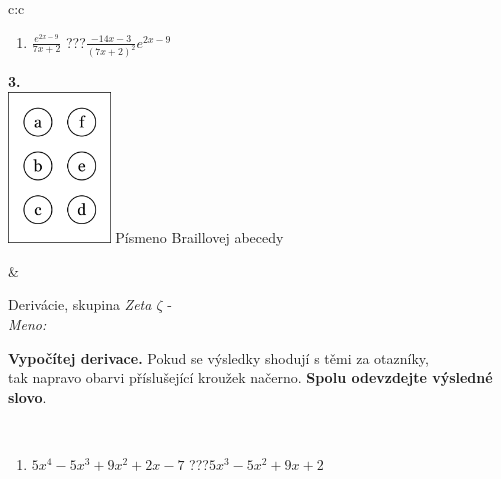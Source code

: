 \documentclass[10pt]{report}
\begin{document}
\begin{tabular}{c:c}
\begin{minipage}[c][104.5mm][t]{0.5\linewidth}
\begin{center}
\begin{minipage}{0.79\linewidth}
\begin{center}
\begin{varwidth}{\linewidth}
\begin{enumerate}
\item $\frac{e^{2x-9}}{7x+2}$\quad \dotfill\; ???\;\dotfill \quad $\frac{-14x-3}{(7x+2)^2}e^{2x-9}$
\end{enumerate}
\end{varwidth}
\end{center}
\end{minipage}
\begin{minipage}{0.20\linewidth}
\begin{center}
{\Huge\bfseries 3.} \\[2mm]
\includegraphics[height=40mm]{../images/braille.png}
{\small Písmeno Braillovej abecedy}
\end{center}
\end{minipage}
\end{center}
\end{minipage}
&
\begin{minipage}[c][104.5mm][t]{0.5\linewidth}
\begin{center}
\vspace{7mm}
{\huge Derivácie, skupina \textit{Zeta $\zeta$} -}\\[5mm]
\textit{Meno:}\phantom{xxxxxxxxxxxxxxxxxxxxxxxxxxxxxxxxxxxxxxxxxxxxxxxxxxxxxxxxxxxxxxxxx}\\[5mm]
\begin{minipage}{0.95\linewidth}
\begin{center}
\textbf{Vypočítej derivace.} Pokud se výsledky shodují s těmi za otazníky,\\tak napravo obarvi příslušející kroužek načerno. \textbf{Spolu odevzdejte výsledné slovo}.
\end{center}
\end{minipage}
\\[1mm]
\begin{minipage}{0.79\linewidth}
\begin{center}
\begin{varwidth}{\linewidth}
\begin{enumerate}
\normalsize
\item $5x^4-5x^3+9x^2+2x-7$\quad \dotfill\; ???\;\dotfill \quad $5x^3-5x^2+9x+2$

\end{enumerate}
\end{varwidth}
\end{center}
\end{minipage}
\end{center}
\end{minipage}
\end{tabular}
\end{document}
